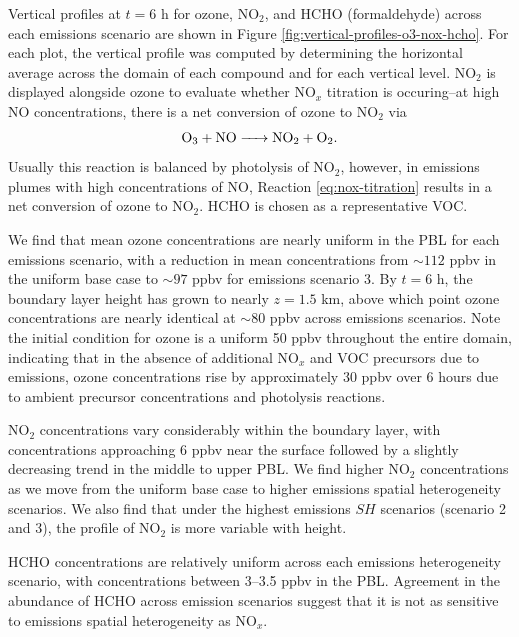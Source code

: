 Vertical profiles at $t=6$ h for ozone, NO$_2$, and HCHO (formaldehyde) across each emissions scenario are shown in Figure \ref{fig:vertical-profiles-o3-nox-hcho}. For each plot, the vertical profile was computed by determining the horizontal average across the domain of each compound and for each vertical level. NO$_2$ is displayed alongside ozone to evaluate whether NO$_x$ titration is occuring--at high NO concentrations, there is a net conversion of ozone to NO$_2$ via 
\begin{equation}
\ce{O_3 + NO -> NO_2 + O_2}.
\label{eq:nox-titration}
\end{equation}
Usually this reaction is balanced by photolysis of NO$_2$, however, in emissions plumes with high concentrations of NO, Reaction \ref{eq:nox-titration} results in a net conversion of ozone to NO$_2$. HCHO is chosen as a representative VOC.

We find that mean ozone concentrations are nearly uniform in the PBL for each emissions scenario, with a reduction in mean concentrations from $\sim 112$ ppbv in the uniform base case to $\sim 97$ ppbv for emissions scenario 3. By $t=6$ h, the boundary layer height has grown to nearly $z=1.5$ \si{km}, above which point ozone concentrations are nearly identical at $\sim80$ \si{ppbv} across emissions scenarios. Note the initial condition for ozone is a uniform 50 \si{ppbv} throughout the entire domain, indicating that in the absence of additional NO$_x$ and VOC precursors due to emissions, ozone concentrations rise by approximately 30 \si{ppbv} over 6 hours due to ambient precursor concentrations and photolysis reactions.

NO$_2$ concentrations vary considerably within the boundary layer, with concentrations approaching 6 ppbv near the surface followed by a slightly decreasing trend in the middle to upper PBL. We find higher NO$_2$ concentrations as we move from the uniform base case to higher emissions spatial heterogeneity scenarios. We also find that under the highest emissions $SH$ scenarios (scenario 2 and 3), the profile of NO$_2$ is more variable with height.

HCHO concentrations are relatively uniform across each emissions heterogeneity scenario, with concentrations between 3--3.5 \si{ppbv} in the PBL. Agreement in the abundance of HCHO across emission scenarios suggest that it is not as sensitive to emissions spatial heterogeneity as NO$_x$. 

